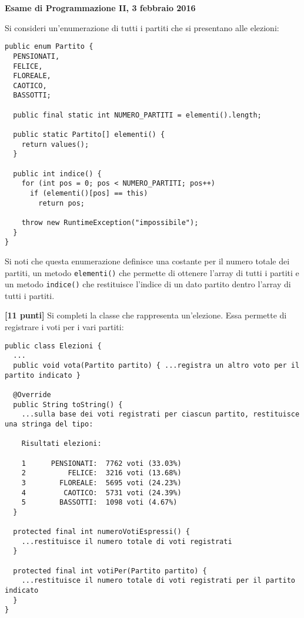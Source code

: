 \documentclass{article}[10pt]
\newcounter{esnu}
\newenvironment{esercizio}{\medskip \noindent {\bf Esercizio\addtocounter{esnu}{1} \arabic{esnu}}}{}
\begin{document}
\begin{center} {\bf Esame di Programmazione II, 3 febbraio 2016}\end{center}

Si consideri un'enumerazione di tutti i partiti che si presentano alle elezioni:

{\small\begin{verbatim}
public enum Partito {
  PENSIONATI,
  FELICE,
  FLOREALE,
  CAOTICO,
  BASSOTTI;

  public final static int NUMERO_PARTITI = elementi().length;

  public static Partito[] elementi() {
    return values();
  }

  public int indice() {
    for (int pos = 0; pos < NUMERO_PARTITI; pos++)
      if (elementi()[pos] == this)
        return pos;

    throw new RuntimeException("impossibile");
  }
}
\end{verbatim}
}

\noindent
Si noti che questa enumerazione definisce una costante per il numero
totale dei partiti, un metodo \texttt{elementi()} che permette di ottenere l'array
di tutti i partiti e un metodo \texttt{indice()} che restituisce l'indice di un dato partito
dentro l'array di tutti i partiti.

\begin{esercizio}
\textbf{[11 punti]}
Si completi la classe che rappresenta un'elezione. Essa permette di registrare i voti per
i vari partiti:

{\small\begin{verbatim}
public class Elezioni {
  ...
  public void vota(Partito partito) { ...registra un altro voto per il partito indicato }

  @Override
  public String toString() {
    ...sulla base dei voti registrati per ciascun partito, restituisce una stringa del tipo:

    Risultati elezioni:

    1      PENSIONATI:  7762 voti (33.03%)
    2          FELICE:  3216 voti (13.68%)
    3        FLOREALE:  5695 voti (24.23%)
    4         CAOTICO:  5731 voti (24.39%)
    5        BASSOTTI:  1098 voti (4.67%)    
  }

  protected final int numeroVotiEspressi() {
    ...restituisce il numero totale di voti registrati
  }

  protected final int votiPer(Partito partito) {
    ...restituisce il numero totale di voti registrati per il partito indicato
  }
}
\end{verbatim}}

\end{esercizio}
\end{document}
